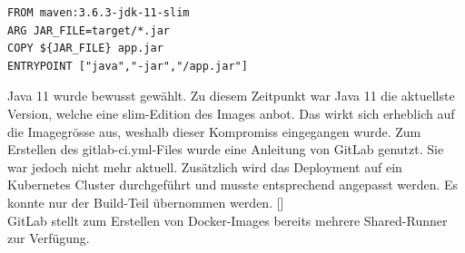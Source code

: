 \begin{verbatim}
FROM maven:3.6.3-jdk-11-slim
ARG JAR_FILE=target/*.jar
COPY ${JAR_FILE} app.jar
ENTRYPOINT ["java","-jar","/app.jar"]
\end{verbatim}
Java 11 wurde bewusst gewählt. Zu diesem Zeitpunkt war Java 11 die aktuellste Version, welche eine slim-Edition des Images anbot. Das wirkt sich erheblich auf die Imagegrösse aus, weshalb dieser Kompromiss eingegangen wurde. 
Zum Erstellen des gitlab-ci.yml-Files wurde eine Anleitung von \gls{GitLab} genutzt. Sie war jedoch nicht mehr aktuell. Zusätzlich wird das Deployment auf ein Kubernetes Cluster durchgeführt und musste entsprechend angepasst werden. Es konnte nur der Build-Teil übernommen werden. [\cite{springBootCI}]\\
\gls{GitLab} stellt zum Erstellen von Docker-Images bereits mehrere Shared-Runner zur Verfügung. 
